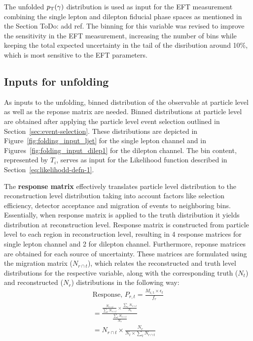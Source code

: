 The unfolded $p_{\text{T}}(\gamma)$ distribution is used as input for the EFT measurement combining the single lepton and dilepton fiducial phase spaces as mentioned in the Section {ToDo: add ref}. The binning for this variable was revised to improve the sensitivity in the EFT measurement, increasing the number of bins while keeping the total expected uncertainty in the tail of the disribution around 10\%, which is most sensitive to the EFT parameters.  



\subsection{Inputs for unfolding}
\label{sec:inputs-for-unfolding}
As inputs to the unfolding, binned distribution of the observable at particle level as well as the reponse matrix are needed. Binned distributions at particle level are obtained after applying the particle level event selection outlined in Section~\ref{sec:event-selection}. These distributions are depicted in Figure~\ref{fig:folding_input_ljet} for the single lepton channel and in Figures~\ref{fig:folding_input_dilep1} for the dilepton channel. The bin content, represented by $T_{i}$, serves as input for the Likelihood function described in Section~\ref{eq:likelihodd-defn-1}.

The \textbf{response matrix} effectively translates particle level distribution to the reconstruction level distribution taking into account factors like selection efficiency, detector acceptance and migration of events to neighboring bins. Essentially, when response matrix is applied to the truth distribution it yields distribution at reconstruction level. Response matrix is constructed from particle level to each region in reconstruction level, resulting in 4 response matrices for single lepton channel and 2 for dilepton channel. Furthermore, reponse matrices are obtained for each source of uncertainty. These matrices are formulated using the migration matrix ($N_{r \cap t}$), which relates the reconstructed and truth level distributions for the respective variable, along with the corresponding truth ($N_{t}$) and reconstructed ($N_{r}$) distributions in the following way:
\begin{align}
    \text{Response, } P_{r,t} = \frac{M_{\mathrm{r,t}} \times \epsilon_{t}}{f_{r}}\\
    = \frac{\frac{N_{r \cap t}}{\sum_{r} N_{r \cap t}} \times \frac{\sum_{r} N_{r \cap t}}{N_{t}}}{\frac{\sum_{t} N_{r \cap t}}{N_{r}}}\\
    = N_{r \cap t} \times \frac{N_{r}}{N_{t}\times \sum_{t} N_{r \cap t}}
\end{align}

